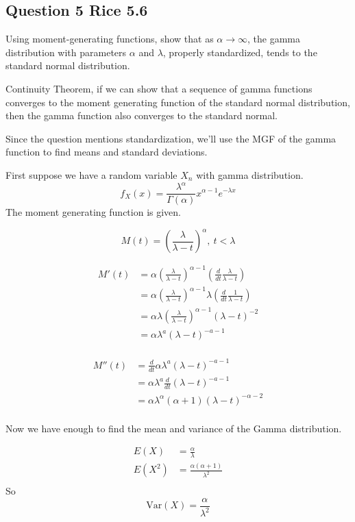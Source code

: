 \documentclass{tufte-book}
\newcommand{\Var}{\mathrm{Var}}
\theoremstyle{mytheoremstyle}
\theoremstyle{mylemstyle}
\theoremstyle{mydefstyle}
\begin{document}
\subsection{Question 5 Rice 5.6}
Using moment-generating functions, show that as $\alpha \to \infty$, the gamma distribution with parameters $\alpha$ and $\lambda$, properly standardized, tends to the standard normal distribution.

 Continuity Theorem, if we can show that a sequence of gamma functions converges to the moment generating function of the standard normal distribution, then the gamma function also converges to the standard normal.

Since the question mentions standardization, we'll use the MGF of the gamma function to find means and standard deviations.

First suppose we have a random variable $X_n$ with gamma distribution.
\[ f_X(x) = \frac{\lambda^{\alpha}}{\Gamma(\alpha)} x^{\alpha-1}e^{-\lambda x} \]
The moment generating function is given.

\[M(t) = (\frac{\lambda}{\lambda-t})^\alpha ,\ t < \lambda \]

\begin{align*}
M'(t) &= \alpha(\frac{\lambda}{\lambda-t})^{\alpha-1}(\frac{d}{dt}\frac{\lambda}{\lambda-t})\\
&= \alpha(\frac{\lambda}{\lambda-t})^{\alpha-1} \lambda(\frac{d}{dt}\frac{1}{\lambda-t})\\
&= \alpha \lambda(\frac{\lambda}{\lambda-t})^{\alpha-1} (\lambda-t)^{-2}\\
&= \alpha \lambda^{a}(\lambda-t)^{-a-1}\\
\end{align*}

\begin{align*}
M''(t) &=\frac{d}{dt} \alpha \lambda^{a}(\lambda-t)^{-a-1}\\
&= \alpha \lambda^{a} \frac{d}{dt}(\lambda-t)^{-a-1}\\
&=  \alpha \lambda^{\alpha} (\alpha+1)(\lambda-t)^{-\alpha-2}\\
\end{align*}

Now we have enough to find the mean and variance of the Gamma distribution.

\begin{align*}
E(X) &= \frac{\alpha}{\lambda}\\
E(X^2) &= \frac{\alpha(\alpha+1)}{\lambda^2}\\
\end{align*}
So
\[ \Var(X) = \frac{\alpha}{\lambda^2} \]
\end{document}
